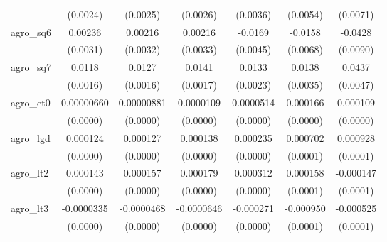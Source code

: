 {\begin{tabular}{l*{6}{c}}
                    &    (0.0024)         &    (0.0025)         &    (0.0026)         &    (0.0036)         &    (0.0054)         &    (0.0071)         \\
\addlinespace
agro\_sq6            &     0.00236         &     0.00216         &     0.00216         &     -0.0169\sym{***}&     -0.0158\sym{*}  &     -0.0428\sym{***}\\
                    &    (0.0031)         &    (0.0032)         &    (0.0033)         &    (0.0045)         &    (0.0068)         &    (0.0090)         \\
\addlinespace
agro\_sq7            &      0.0118\sym{***}&      0.0127\sym{***}&      0.0141\sym{***}&      0.0133\sym{***}&      0.0138\sym{***}&      0.0437\sym{***}\\
                    &    (0.0016)         &    (0.0016)         &    (0.0017)         &    (0.0023)         &    (0.0035)         &    (0.0047)         \\
\addlinespace
agro\_et0            &  0.00000660         &  0.00000881         &   0.0000109\sym{*}  &   0.0000514\sym{***}&    0.000166\sym{***}&    0.000109\sym{***}\\
                    &    (0.0000)         &    (0.0000)         &    (0.0000)         &    (0.0000)         &    (0.0000)         &    (0.0000)         \\
\addlinespace
agro\_lgd            &    0.000124\sym{***}&    0.000127\sym{***}&    0.000138\sym{***}&    0.000235\sym{***}&    0.000702\sym{***}&    0.000928\sym{***}\\
                    &    (0.0000)         &    (0.0000)         &    (0.0000)         &    (0.0000)         &    (0.0001)         &    (0.0001)         \\
\addlinespace
agro\_lt2            &    0.000143\sym{***}&    0.000157\sym{***}&    0.000179\sym{***}&    0.000312\sym{***}&    0.000158\sym{*}  &   -0.000147         \\
                    &    (0.0000)         &    (0.0000)         &    (0.0000)         &    (0.0000)         &    (0.0001)         &    (0.0001)         \\
\addlinespace
agro\_lt3            &  -0.0000335         &  -0.0000468         &  -0.0000646\sym{*}  &   -0.000271\sym{***}&   -0.000950\sym{***}&   -0.000525\sym{***}\\
                    &    (0.0000)         &    (0.0000)         &    (0.0000)         &    (0.0000)         &    (0.0001)         &    (0.0001)         \\

\end{tabular}}
